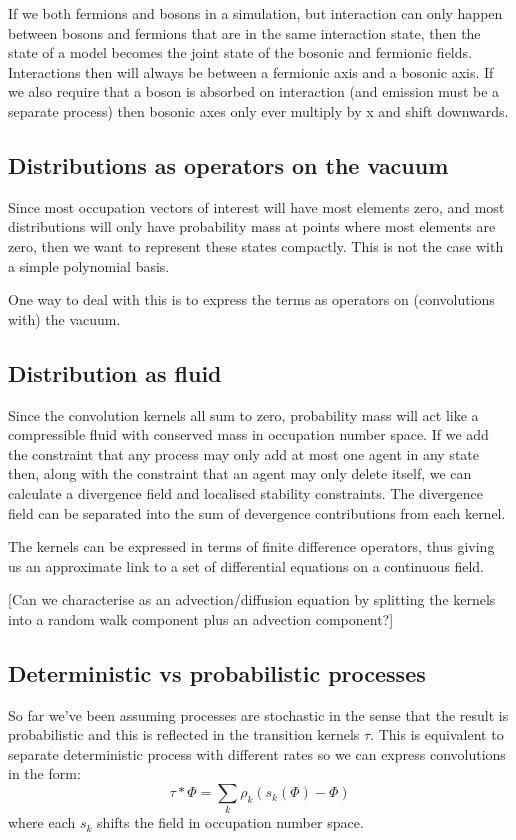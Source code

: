 \documentclass[a4paper]{article}
\begin{document}
If we both fermions and bosons in a simulation, but interaction can only happen between bosons and fermions that are in the same interaction state, then the state of a model becomes the joint state of the bosonic and fermionic fields. Interactions then will always be between a fermionic axis and a bosonic axis. If we also require that a boson is absorbed on interaction (and emission must be a separate process) then bosonic axes only ever multiply by x and shift downwards.

\subsection{Distributions as operators on the vacuum}
Since most occupation vectors of interest will have most elements zero, and most distributions will only have probability mass at points where most elements are zero, then we want to represent these states compactly. This is not the case with a simple polynomial basis.

One way to deal with this is to express the terms as operators on (convolutions with) the vacuum.

\subsection{Distribution as fluid}
Since the convolution kernels all sum to zero, probability mass will act like a compressible fluid with conserved mass in occupation number space. If we add the constraint that any process may only add at most one agent in any state then, along with the constraint that an agent may only delete itself, we can calculate a divergence field and localised stability constraints. The divergence field can be separated into the sum of devergence contributions from each kernel.

The kernels can be expressed in terms of finite difference operators, thus giving us an approximate link to a set of differential equations on a continuous field.

[Can we characterise as an advection/diffusion equation by splitting the kernels into a random walk component plus an advection component?]

\subsection{Deterministic vs probabilistic processes}

So far we've been assuming processes are stochastic in the sense that the result is probabilistic and this is reflected in the transition kernels $\tau$. This is equivalent to separate deterministic process with different rates so we can express convolutions in the form:
\[
\tau \ast \Phi = \sum_k \rho_k(s_k(\Phi) - \Phi)
\]
where each $s_k$ shifts the field in occupation number space.
\end{document}
